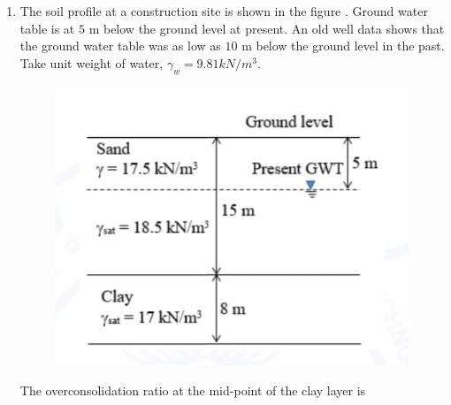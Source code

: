 \documentclass[journal,12pt,onecolumn]{article}
\theoremstyle{remark}
\begin{document}
\begin{enumerate}
\item The soil profile at a construction site is shown in the figure . Ground water table  is at $5$ m below the ground level at present. An old well data shows that the ground water table was as low as $10$ m below the ground level in the past. Take unit weight of water, $\gamma_w = 9.81 kN/m^3$.
\begin{figure}[H]
    \centering
    \includegraphics[width=0.7\columnwidth]{figs/1q44.jpg}
    \caption{}
    \label{fig:q44}
\end{figure}
The overconsolidation ratio   at the mid-point of the clay layer is \underline{\hspace{2cm}}

\hfill{}


\end{enumerate}
\end{document}
